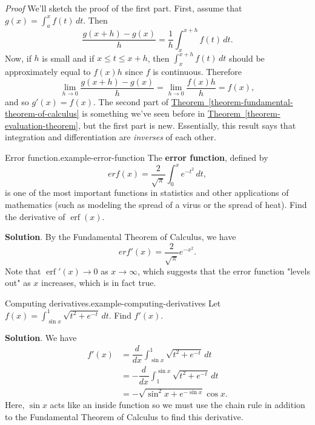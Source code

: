 \documentclass[10pt,]{book}
\makeatletter
\newcommand{\terminology}[1]{\textbf{#1}}
\renewcommand*{\proofname}{Proof}
\renewenvironment{proof}[1][\proofname]{\par
  \pushQED{\qed}%
  \normalfont \topsep6\p@\@plus6\p@\relax
  \trivlist
  \item\relax
    {\itshape
    #1\@addpunct{.}}\hspace\labelsep\ignorespaces
}{%
  \popQED\endtrivlist\@endpefalse
}
\numberwithin{equation}{section}
\newcommand{\dv}[3][]{\dfrac{d^{#1} #2}{d #3^{#1}}}
\newcommand{\erf}[1]{\operatorname{erf} #1}
\makeatother
\begin{document}
\begin{proof}\hypertarget{proof-11}{}
\hypertarget{p-467}{}%
We'll sketch the proof of the first part. First, assume that \(g(x) = \int_{a}^{x}f(t)\,dt\). Then%
\begin{equation*}
\frac{g(x+h)-g(x)}{h} = \frac{1}{h}\int_{x}^{x+h}f(t)\,dt.
\end{equation*}
Now, if \(h\) is small and if \(x\leq t\leq x+h\), then \(\int_{x}^{x+h}f(t)\,dt\) should be approximately equal to \(f(x)h\) since \(f\) is continuous. Therefore%
\begin{equation*}
\lim_{h\to0}\frac{g(x+h)-g(x)}{h} = \lim_{h\to0}\frac{f(x)h}{h} = f(x),
\end{equation*}
and so \(g'(x) = f(x)\).%
\end{proof}
\hypertarget{p-468}{}%
The second part of \hyperref[theorem-fundamental-theorem-of-calculus]{Theorem~\ref{theorem-fundamental-theorem-of-calculus}} is something we've seen before in \hyperref[theorem-evaluation-theorem]{Theorem~\ref{theorem-evaluation-theorem}}, but the first part is new. Essentially, this result says that integration and differentiation are \emph{inverses} of each other.%
\begin{example}{Error function.}{example-error-function}%
\hypertarget{p-469}{}%
The \terminology{error function}, defined by%
\begin{equation*}
erf(x) = \frac{2}{\sqrt{\pi}}\int_{0}^{x}e^{-t^{2}}\,dt,
\end{equation*}
is one of the most important functions in statistics and other applications of mathematics (such as modeling the spread of a virus or the spread of heat). Find the derivative of \(\erf(x)\).%
\par\smallskip%
\noindent\textbf{Solution}.\hypertarget{solution-102}{}\quad%
\hypertarget{p-470}{}%
By the Fundamental Theorem of Calculus, we have%
\begin{equation*}
erf'(x) = \frac{2}{\sqrt{\pi}}e^{-x^{2}}.
\end{equation*}
Note that \(\erf'(x)\to0\) as \(x\to\infty\), which suggests that the error function "levels out" as \(x\) increases, which is in fact true.%
\end{example}
\begin{example}{Computing derivatives.}{example-computing-derivatives}%
\hypertarget{p-471}{}%
Let \(f(x) = \int_{\sin x}^{1}\sqrt{t^{2} + e^{-t}}\,dt.\) Find \(f'(x)\).%
\par\smallskip%
\noindent\textbf{Solution}.\hypertarget{solution-103}{}\quad%
\hypertarget{p-472}{}%
We have%
\begin{align*}
f'(x) & = \dv{}{x}\int_{\sin x}^{1}\sqrt{t^{2} + e^{-t}}\,dt \\
& = -\dv{}{x}\int_{1}^{\sin x}\sqrt{t^{2} + e^{-t}}\,dt \\
& = -\sqrt{\sin^{2}x+e^{-\sin x}}\cos x. 
\end{align*}
Here, \(\sin x\) acts like an inside function so we must use the chain rule in addition to the Fundamental Theorem of Calculus to find this derivative.%
\end{example}
\end{document}
